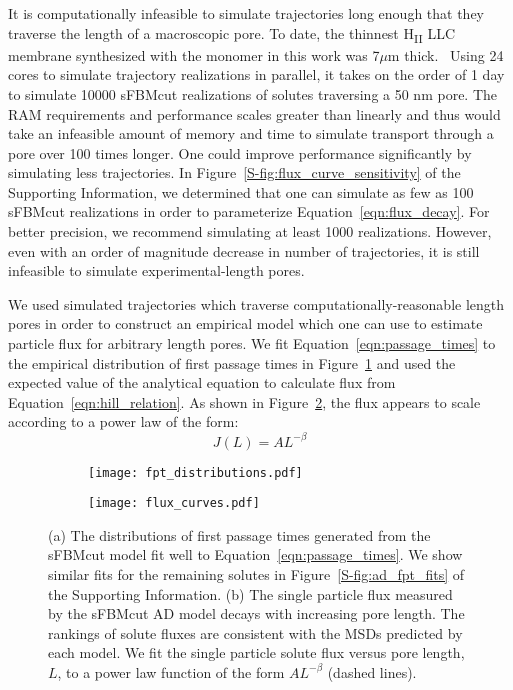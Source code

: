 \documentclass[journal=ancac3,manuscript=article,layout=twocolumn]{achemso}
\begin{document}
  It is computationally infeasible to simulate trajectories long enough that
  they traverse the length of a macroscopic pore. To date, the thinnest
  H\textsubscript{II} LLC membrane synthesized with the monomer in this work
  was 7$\mu$m thick.~\cite{feng_thin_2016}
  Using 24 cores to simulate trajectory realizations in
  parallel, it takes on the order of 1 day to simulate 10000 sFBMcut
  realizations of solutes traversing a 50 nm pore. The RAM requirements and
  performance scales greater than linearly and thus would take an infeasible
  amount of memory and time to simulate transport through a pore over 100 times
  longer. One could improve performance significantly by simulating less
  trajectories. In Figure~\ref{S-fig:flux_curve_sensitivity} of the Supporting
  Information, we determined that one can simulate as few as 100 sFBMcut
  realizations in order to parameterize Equation~\ref{eqn:flux_decay}. For
  better precision, we recommend simulating at least 1000 realizations.
  However, even with an order of magnitude decrease in number of trajectories,
  it is still infeasible to simulate experimental-length pores.
  
  We used simulated trajectories which traverse computationally-reasonable
  length pores in order to construct an empirical model which one can use to
  estimate particle flux for arbitrary length pores. We fit
  Equation~\ref{eqn:passage_times} to the empirical distribution of first
  passage times in Figure~\ref{fig:fpt_distributions} and used the expected
  value of the analytical equation to calculate flux from
  Equation~\ref{eqn:hill_relation}. As shown in
  Figure~\ref{fig:flux_curves_ad}, the flux appears to scale according to a
  power law of the form:
  \begin{equation}
  J(L) = AL^{-\beta} 
  \label{eqn:flux_decay}
  \end{equation}

  \begin{figure*}
  \centering
  \begin{subfigure}{0.485\textwidth}
  \texttt{[image: fpt\_distributions.pdf]}
  \caption{}\label{fig:fpt_distributions}
  \end{subfigure}
  \begin{subfigure}{0.485\textwidth}
  \texttt{[image: flux\_curves.pdf]}
  \caption{}\label{fig:flux_curves_ad}
  \end{subfigure}
  \caption{(a) The distributions of first passage times generated from the
	  sFBMcut model fit well to Equation~\ref{eqn:passage_times}. We show
	  similar fits for the remaining solutes in
	  Figure~\ref{S-fig:ad_fpt_fits} of the Supporting Information. (b) The
	  single particle flux measured by the sFBMcut AD model decays with
	  increasing pore length. The rankings of solute fluxes are consistent
	  with the MSDs predicted by each model. We fit the single particle
	  solute flux versus pore length, $L$, to a power law function of the
	  form $AL^{-\beta}$ (dashed lines). 
  }\label{fig:flux_curves}
  \end{figure*}
\end{document}

